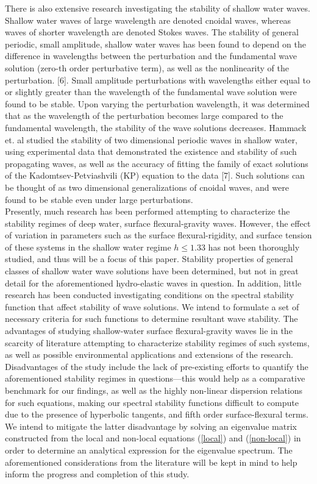 \documentclass{article}
\begin{document}
There is also extensive research investigating the stability of shallow water waves. Shallow water waves of large wavelength are denoted cnoidal waves, whereas waves of shorter wavelength are denoted Stokes waves. The stability of general periodic, small amplitude, shallow water waves has been found to depend on the difference in wavelengths between the perturbation and the fundamental wave solution (zero-th order perturbative term), as well as the nonlinearity of the perturbation. [6]. Small amplitude perturbations with wavelengths either equal to or slightly greater than the wavelength of the fundamental wave solution were found to be stable. Upon varying the perturbation wavelength, it was determined that as the wavelength of the perturbation becomes large compared to the fundamental wavelength, the stability of the wave solutions decreases. Hammack et. al studied the stability of two dimensional periodic waves in shallow water, using experimental data that demonstrated the existence and stability of such propagating waves, as well as the accuracy of fitting the family of exact solutions of the Kadomtsev-Petviashvili (KP) equation to the data [7]. Such solutions can be thought of as two dimensional generalizations of cnoidal waves, and were found to be stable even under large perturbations. 
\\



Presently, much research has been performed attempting to characterize the stability regimes of deep water, surface flexural-gravity waves. However, the effect of variation in parameters such as the surface flexural-rigidity, and surface tension of these systems in the shallow water regime \(h \leq 1.33\) has not been thoroughly studied, and thus will be a focus of this paper. Stability properties of general classes of shallow water wave solutions have been determined, but not in great detail for the aforementioned hydro-elastic waves in question.  In addition, little research has been conducted investigating conditions on the spectral stability function that affect stability of wave solutions. We intend to formulate a set of necessary criteria for such functions to determine resultant wave stability. The advantages of studying shallow-water surface flexural-gravity waves lie in the scarcity of literature attempting to characterize stability regimes of such systems, as well as possible environmental applications and extensions of the research. Disadvantages of the study include the lack of pre-existing efforts to quantify the aforementioned stability regimes in questions—this would help as a comparative benchmark for our findings, as well as the highly non-linear dispersion relations for such equations, making our spectral stability functions difficult to compute due to the presence of hyperbolic tangents, and fifth order surface-flexural terms. We intend to mitigate the latter disadvantage by solving an eigenvalue matrix constructed from the local and non-local equations (\ref{local}) and (\ref{non-local}) in order to determine an analytical expression for the eigenvalue spectrum. The aforementioned considerations from the literature will be kept in mind to help inform the progress and completion of this study. \\
\end{document}
